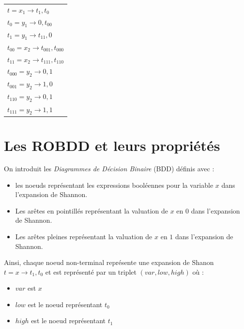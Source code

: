 \documentclass[a4paper, oneside]{report}
\begin{document}
\begin{center}
\begin{tabular}{l}
$t = x_1 \rightarrow t_1, t_0$\\
$t_0 = y_1 \rightarrow 0, t_{00}$\\
$t_1 = y_1 \rightarrow t_{11}, 0$\\
$t_{00} = x_2 \rightarrow t_{001}, t_{000}$\\
$t_{11} = x_2 \rightarrow t_{111}, t_{110}$\\
$t_{000} = y_2 \rightarrow 0, 1$\\
$t_{001} = y_2 \rightarrow 1, 0$\\
$t_{110} = y_2 \rightarrow 0, 1$\\
$t_{111} = y_2 \rightarrow 1, 1$\\
\end{tabular}
\end{center}

\section{Les ROBDD et leurs propriétés}

\noindent On introduit les \textit{Diagrammes de Décision Binaire} (BDD) définis avec :
\begin{itemize}
\item les noeuds représentant les expressions booléennes pour la variable $x$ dans l'expansion de Shannon.
\item Les arêtes en pointillés représentant la valuation de $x$ en $0$ dans l'expansion de Shannon.
\item Les arêtes pleines représentant la valuation de $x$ en $1$ dans l'expansion de Shannon.
\end{itemize}

\noindent Ainsi, chaque noeud non-terminal représente une expansion de Shanon $ t = x \rightarrow t_1, t_0 $ et est représenté par un triplet $(var, low, high)$ où :
\begin{itemize}
\item $var$ est $x$
\item $low$ est le noeud représentant $t_0$
\item $high$ est le noeud représentant $t_1$
\end{itemize}
\end{document}

